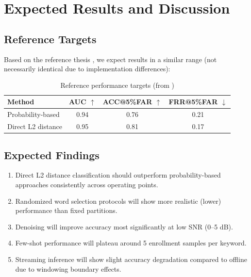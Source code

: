 \documentclass[12pt,a4paper]{report}
\begin{document}
\chapter{Expected Results and Discussion}

\section{Reference Targets}

Based on the reference thesis \cite{binh2025}, we expect results in a similar
range (not necessarily identical due to implementation differences):

\begin{table}[h]
\centering
\caption{Reference performance targets (from \cite{binh2025})}
\label{tab:expected}
\begin{tabular}{lccc}
\toprule
\textbf{Method} & \textbf{AUC} $\uparrow$ &
\textbf{ACC@5\%FAR} $\uparrow$ & \textbf{FRR@5\%FAR} $\downarrow$ \\
\midrule
Probability-based & 0.94 & 0.76 & 0.21 \\
Direct L2 distance & 0.95 & 0.81 & 0.17 \\
\bottomrule
\end{tabular}
\end{table}

\section{Expected Findings}

\begin{enumerate}
    \item Direct L2 distance classification should outperform probability-based
          approaches consistently across operating points.
    \item Randomized word selection protocols will show more realistic (lower)
          performance than fixed partitions.
    \item Denoising will improve accuracy most significantly at low SNR
          (0--5 dB).
    \item Few-shot performance will plateau around 5 enrollment samples per
          keyword.
    \item Streaming inference will show slight accuracy degradation compared
          to offline due to windowing boundary effects.
\end{enumerate}
\end{document}

